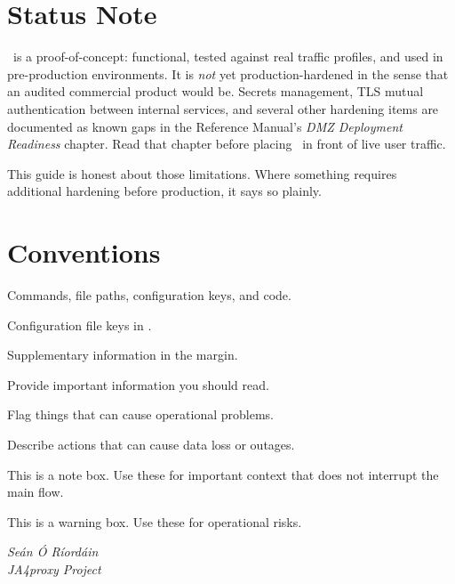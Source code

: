 \section*{Status Note}

\ja\ is a proof-of-concept: functional, tested against real traffic profiles, and
used in pre-production environments. It is \emph{not} yet production-hardened in the
sense that an audited commercial product would be. Secrets management, TLS mutual
authentication between internal services, and several other hardening items are
documented as known gaps in the Reference Manual's \emph{DMZ Deployment Readiness}
chapter. Read that chapter before placing \ja\ in front of live user traffic.

This guide is honest about those limitations. Where something requires additional
hardening before production, it says so plainly.

\section*{Conventions}

\begin{description}[leftmargin=3cm, style=nextline]
  \item[\code{monospace}] Commands, file paths, configuration keys, and code.
  \item[\configkey{config.key}] Configuration file keys in .
  \item[\emph{Side notes}] Supplementary information in the margin.
  \item[\emph{Note boxes}] Provide important information you should read.
  \item[\emph{Warning boxes}] Flag things that can cause operational problems.
  \item[\emph{Danger boxes}] Describe actions that can cause data loss or outages.
\end{description}

\vspace{0.5\baselineskip}
\begin{notebox}
This is a note box. Use these for important context that does not interrupt the main flow.
\end{notebox}

\begin{warningbox}
This is a warning box. Use these for operational risks.
\end{warningbox}

\vspace{\baselineskip}
\noindent\emph{Seán Ó Ríordáin\\
JA4proxy Project}
